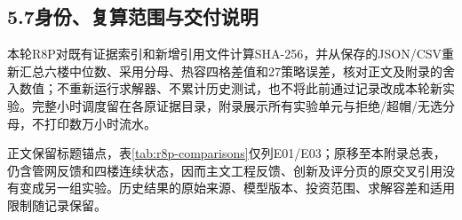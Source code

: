 \subsection*{5.7\quad 身份、复算范围与交付说明}
本轮R8P对既有证据索引和新增引用文件计算SHA-256，并从保存的JSON/CSV重新汇总六楼中位数、采用分母、热容四格差值和27策略误差，核对正文及附录的舍入数值；不重新运行求解器、不累计历史测试，也不将此前通过记录改成本轮新实验。完整小时调度留在各原证据目录，附录展示所有实验单元与拒绝/超帽/无选分母，不打印数万小时流水。

正文保留标题锚点，表\ref{tab:r8p-comparisons}仅列E01/E03；原移至本附录总表，仍含管网反馈和四楼连续状态，因而主文工程反馈、创新及评分页的原交叉引用没有变成另一组实验。历史结果的原始来源、模型版本、投资范围、求解容差和适用限制随记录保留。
